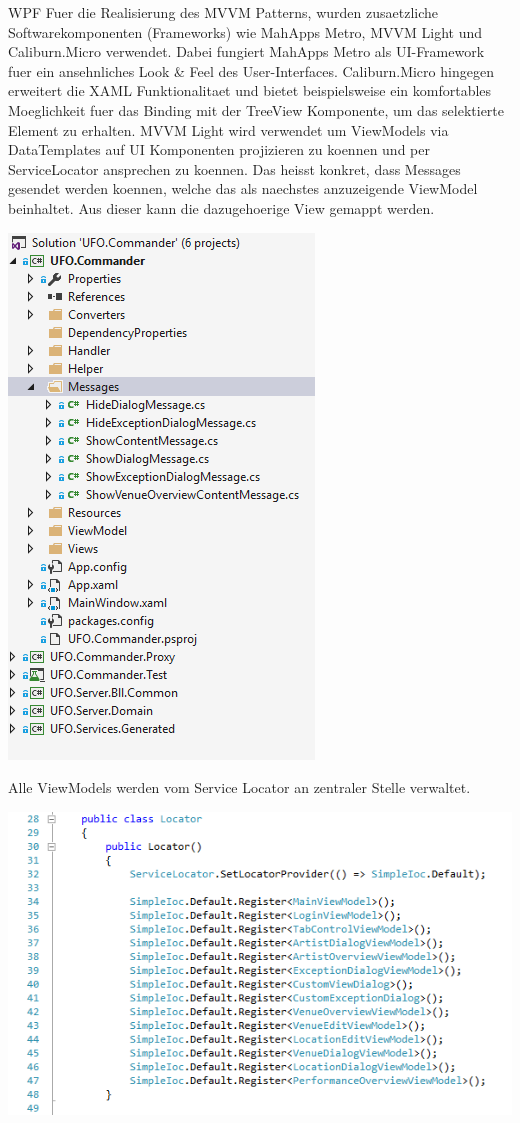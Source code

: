 \begin{section}{WPF}
Fuer die Realisierung des MVVM Patterns, wurden zusaetzliche Softwarekomponenten (Frameworks) wie MahApps Metro, MVVM Light und Caliburn.Micro verwendet. Dabei fungiert MahApps Metro als UI-Framework fuer ein ansehnliches Look \& Feel des User-Interfaces. Caliburn.Micro hingegen erweitert die XAML Funktionalitaet und bietet beispielsweise ein komfortables Moeglichkeit fuer das Binding mit der TreeView Komponente, um das selektierte Element zu erhalten. MVVM Light wird verwendet um ViewModels via DataTemplates auf UI Komponenten projizieren zu koennen und per ServiceLocator ansprechen zu koennen. Das heisst konkret, dass Messages gesendet werden koennen, welche das als naechstes anzuzeigende ViewModel beinhaltet. Aus dieser kann die dazugehoerige View gemappt werden. 

\includegraphics[angle=0, scale=0.45]{./img/messagesproject.PNG}
\FloatBarrier

Alle ViewModels werden vom Service Locator an zentraler Stelle verwaltet.

\includegraphics[angle=0, scale=0.45]{./img/servicelocator.PNG}
\FloatBarrier


\end{section}
